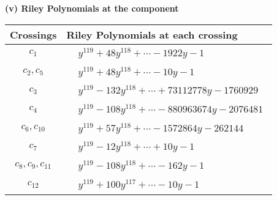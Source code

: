 \documentclass[1p]{elsarticle_modified}
\theoremstyle{definition}
\begin{document}
\newpage\renewcommand{\arraystretch}{1}
\flushleft \textbf{(v) Riley Polynomials at the component}\newline \\
\begin{tabular}{m{50pt}|m{274pt}}
Crossings & \hspace{64pt}Riley Polynomials at each crossing \\
\hline $$\begin{aligned}c_{1}\end{aligned}$$&$\begin{aligned}
&y^{119}+48 y^{118}+\cdots-1922 y-1
\end{aligned}$\\
\hline $$\begin{aligned}c_{2},c_{5}\end{aligned}$$&$\begin{aligned}
&y^{119}+48 y^{118}+\cdots-10 y-1
\end{aligned}$\\
\hline $$\begin{aligned}c_{3}\end{aligned}$$&$\begin{aligned}
&y^{119}-132 y^{118}+\cdots+73112778 y-1760929
\end{aligned}$\\
\hline $$\begin{aligned}c_{4}\end{aligned}$$&$\begin{aligned}
&y^{119}-108 y^{118}+\cdots-880963674 y-2076481
\end{aligned}$\\
\hline $$\begin{aligned}c_{6},c_{10}\end{aligned}$$&$\begin{aligned}
&y^{119}+57 y^{118}+\cdots-1572864 y-262144
\end{aligned}$\\
\hline $$\begin{aligned}c_{7}\end{aligned}$$&$\begin{aligned}
&y^{119}-12 y^{118}+\cdots+10 y-1
\end{aligned}$\\
\hline $$\begin{aligned}c_{8},c_{9},c_{11}\end{aligned}$$&$\begin{aligned}
&y^{119}-108 y^{118}+\cdots-162 y-1
\end{aligned}$\\
\hline $$\begin{aligned}c_{12}\end{aligned}$$&$\begin{aligned}
&y^{119}+100 y^{117}+\cdots-10 y-1
\end{aligned}$\\
\hline
\end{tabular}\\~\\
\end{document}
